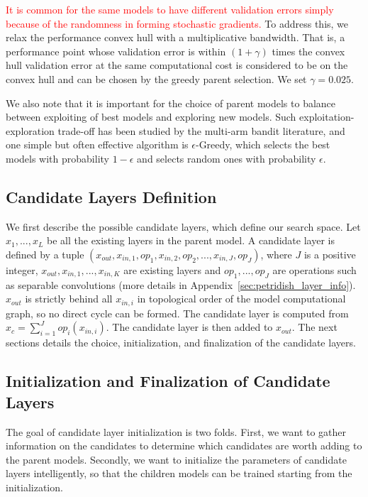 \documentclass{article}
\newcommand{\todo}[1]{\textcolor{red}{#1}}
\begin{document}
\todo{It is common for the same models to have different validation errors simply because of the randomness in forming stochastic gradients. } To address this, we relax the performance convex hull with a multiplicative bandwidth. That is, a performance point whose validation error is within $(1 + \gamma)$ times the convex hull validation error at the same computational cost is considered to be on the convex hull and can be chosen by the greedy parent selection. We set $\gamma = 0.025$. 

We also note that it is important for the choice of parent models to balance between exploiting of best models and exploring new models. Such exploitation-exploration trade-off has been studied by the multi-arm bandit literature, and one simple but often effective algorithm is $\epsilon$-Greedy, which selects the best models with probability $1-\epsilon$ and selects random ones with probability $\epsilon$. 


\subsection{Candidate Layers Definition}
\label{sec:hallu_choice}

We first describe the possible candidate layers, which define our search space. 
Let $x_1,...,x_L$ be all the existing layers in the parent model. A candidate layer 
is defined by a tuple $(x_{out}, x_{in, 1}, op_1, x_{in, 2}, op_2, ..., x_{in, J}, op_J)$, where $J$ is a positive integer, $x_{out}, x_{in, 1},..., x_{in,K}$ are existing layers and $op_1, ..., op_J$ are operations such as separable convolutions (more details in Appendix~\ref{sec:petridish_layer_info}). $x_{out}$ is strictly behind all $x_{in,i}$ in topological order of the model computational graph, so no direct cycle can be formed. The candidate layer is computed from $x_c = \sum _{i=1}^J op_i(x_{in,i})$. The candidate layer is then added to $x_{out}$.
The next sections details the choice, initialization, and finalization of the candidate layers. 


\subsection{Initialization and Finalization of Candidate Layers}
\label{sec:hallu_init}

The goal of candidate layer initialization is two folds. First, we want to gather information on the candidates to determine which candidates are worth adding to the parent models. Secondly, we want to initialize the parameters of candidate layers intelligently, so that the children models can be trained starting from the initialization.
\end{document}
